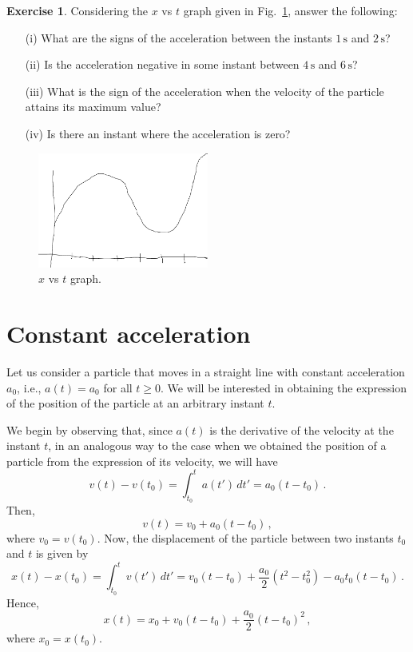 \documentclass[12pt,a4paper]{article}
\theoremstyle{definition}
\newtheorem{ex}{Exercise}[section]
\begin{document}
\begin{ex}
  Considering the $x$ vs $t$ graph given in Fig.~\ref{fig:xvst},
  answer the following:
  \begin{enumerate}
  \item[(i)] What are the signs of the acceleration between the
    instants $1\,\mathrm{s}$ and $2\,\mathrm{s}$?
  \item[(ii)] Is the acceleration negative in some instant between
    $4\,\mathrm{s}$ and $6\,\mathrm{s}$?
  \item[(iii)] What is the sign of the acceleration when the velocity
    of the particle attains its maximum value?
  \item[(iv)] Is there an instant where the acceleration is zero?
  \end{enumerate}
  \begin{figure}[ht]
    \centering
    \includegraphics[width=0.5\textwidth,keepaspectratio]{figures/xvst.pdf}
    \caption{$x$ vs $t$ graph.}
    \label{fig:xvst}
  \end{figure}
\end{ex}

\section{Constant acceleration}

Let us consider a particle that moves in a straight line with constant
acceleration $a_0$, i.e., $a(t)=a_0$ for all $t\ge 0$. We will be
interested in obtaining the expression of the position of the particle
at an arbitrary instant $t$.

We begin by observing that, since $a(t)$ is the derivative of the
velocity at the instant $t$, in an analogous way to the case when we
obtained the position of a particle from the expression of its
velocity, we will have
$$v(t)-v(t_0)=\int_{t_0}^{t}a(t')\,dt'=a_0(t-t_0)\,.$$
Then,
\begin{equation}
  \label{eq:1}
  v(t)=v_0+a_0(t-t_0)\,,
\end{equation}
where $v_0=v(t_0)$.  Now, the displacement of the particle between two
instants $t_0$ and $t$ is given by
$$x(t)-x(t_0)=\int_{t_0}^{t}v(t')\,dt'=v_0(t-t_0)+\frac{a_0}{2}(t^2-t_0^2)-a_0t_0(t-t_0)\,.$$
Hence,
\begin{equation}
  \label{eq:2}
  x(t)=x_0+v_0(t-t_0)+\frac{a_0}{2}(t-t_0)^2\,,
\end{equation}
where $x_0=x(t_0)$.
\end{document}
